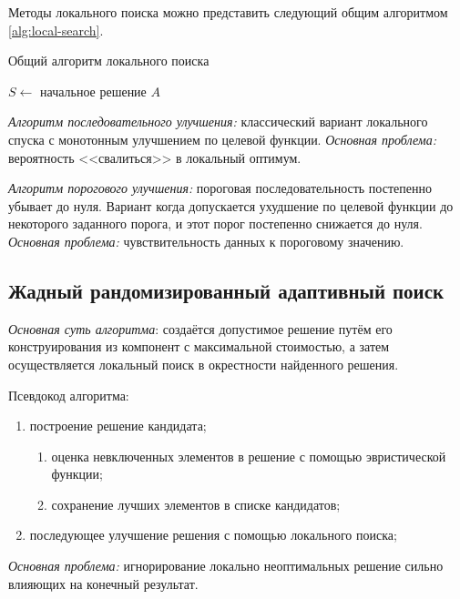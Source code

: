 Методы локального поиска можно представить следующий общим алгоритмом \ref{alg:local-search}.
\begin{algorithm}[ht!]
    \caption{Общий алгоритм локального поиска}
    \( S \leftarrow \) начальное решение \( A \)\;
    \label{alg:local-search}
\end{algorithm}

\emph{Алгоритм последовательного улучшения:} классический вариант локального спуска с монотонным 
улучшением по целевой функции. \emph{Основная проблема:} вероятность <<свалиться>> в локальный оптимум.

\emph{Алгоритм порогового улучшения:} пороговая последовательность постепенно убывает до нуля. Вариант 
когда допускается ухудшение по целевой функции до некоторого заданного порога, и этот порог постепенно 
снижается до нуля. \emph{Основная проблема:} чувствительность данных к пороговому значению.

\subsection{Жадный рандомизированный адаптивный поиск}
\emph{Основная суть алгоритма}: создаётся допустимое решение путём его конструирования из компонент с 
максимальной стоимостью, а затем осуществляется локальный поиск в окрестности найденного решения.

Псевдокод алгоритма:
\begin{enumerate}
    \item построение решение кандидата;
    \begin{enumerate}
        \item оценка невключенных элементов в решение с помощью эвристической функции;
        \item сохранение лучших элементов в списке кандидатов;
    \end{enumerate}
    \item последующее улучшение решения с помощью локального поиска;
\end{enumerate}

\emph{Основная проблема:} игнорирование локально неоптимальных решение сильно влияющих на конечный результат.

